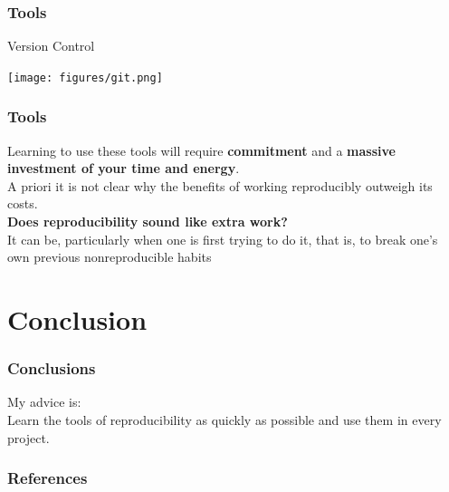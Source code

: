 \documentclass{beamer}
\begin{document}
\begin{frame}
    \frametitle{Tools}
    \begin{center}\Large {\sc Version Control}\end{center}
\begin{center}\texttt{[image: figures/git.png]}\end{center}

\end{frame}
\begin{frame}
\frametitle{Tools}

Learning to use these tools will require \textbf{commitment} and a \textbf{massive investment of your time and energy}.\\ 
A priori it is not clear why the benefits of working reproducibly outweigh its costs.\\

{\bf Does reproducibility sound like extra work?}\\
It can be, particularly when one is first trying to do it, that is, to break one's own previous nonreproducible habits


\end{frame}

\section{Conclusion}

\begin{frame}
\frametitle{Conclusions}

\begin{center}\Huge{\sc My advice is:}\\ \vspace{20pt}
    \Large Learn the tools of reproducibility as quickly as possible and use them in every project.\end{center}
\end{frame}


\begin{frame}
\frametitle{References}
\fontsize{6}{7.2}\selectfont


\end{frame}
\end{document}
